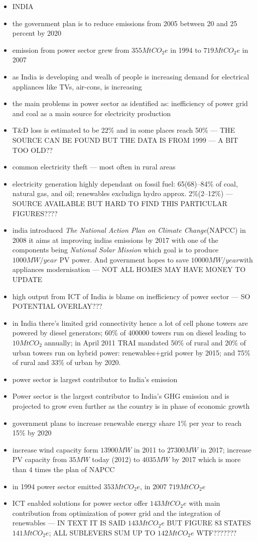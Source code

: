 \documentclass[11pt, twocolumn]{article}
\begin{document}
\begin{itemize}
\item INDIA
\item the government plan is to reduce emissions from 2005 between 20 and 25 percent by 2020
\item emission from power sector grew from $355 MtCO_2e$ in 1994 to $719 MtCO_2e$ in 2007
\item as India is developing and wealh of people is increasing demand for electrical appliances like TVs, air-cons, is increasing
\item the main problems in power sector as identified as: inefficiency of power grid and coal as a main source for electricity production
\item T\&D loss is estimated to be 22\% and in some places reach 50\% --- THE SOURCE CAN BE FOUND BUT THE DATA IS FROM 1999 --- A BIT TOO OLD??
\item common electricity theft --- most often in rural areas
\item electricity generation highly dependant on fossil fuel: 65(68)--84\% of coal, natural gas, and oil; renewables excludign hydro approx. 2\%(2--12\%) --- SOURCE AVAILABLE BUT HARD TO FIND THIS PARTICULAR FIGURES????
\item india introduced \emph{The National Action Plan on Climate Change}(NAPCC) in 2008 it aims at improving indias emissions by 2017 with one of the components being \emph{National Solar Mission} which goal is to produce $1000 MW/year$ PV power. And government hopes to save $10000 MW/year$with appliances modernisation --- NOT ALL HOMES MAY HAVE MONEY TO UPDATE
\item high output from ICT of India is blame on inefficiency of power sector --- SO POTENTIAL OVERLAY???
\item in India there's limited grid connectivity hence a lot of cell phone towers are powered by diesel generators; 60\% of 400000 towers run on diesel leading to $10 MtCO_2$ annually; in April 2011 TRAI mandated 50\% of rural and 20\% of urban towers run on hybrid power: renewables+grid power by 2015; and 75\% of rural and 33\% of urban by 2020.
\item power sector is largest contributor to India's emission
\item Power sector is the largest contributor to India's GHG emission and is projected to grow even further as the country is in phase of economic growth
\item government plans to increase renewable energy share 1\% per year to reach 15\% by 2020
\item increase wind capacity form $13900MW$ in 2011 to $27300MW$ in 2017; increase PV capacity from $35 MW$ today (2012) to $4035 MW$ by 2017 which is more than 4 times the plan of NAPCC
\item in 1994 power sector emitted $353 MtCO_2e$, in 2007 $719 MtCO_2e$
\item ICT enabled solutions for power sector offer $143 MtCO_2e$ with main contribution from optimization of power grid and the integration of renewables --- IN TEXT IT IS SAID $143 MtCO_2e$ BUT FIGURE 83 STATES $141 MtCO_2e$; ALL SUBLEVERS SUM UP TO $142 MtCO_2e$ WTF???????


\end{itemize}
\end{document}
